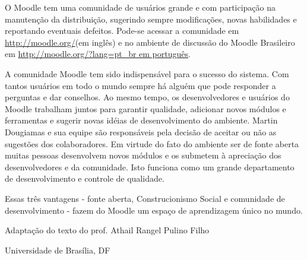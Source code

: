 O Moodle tem uma comunidade de usuários grande e com participação na manutenção da distribuição, sugerindo sempre modificações, novas habilidades e reportando eventuais defeitos. Pode-se acessar a comunidade em  \url{http://moodle.org/}(em inglês) e no ambiente de discussão do Moodle Brasileiro em \url{http://moodle.org/?lang=pt_br em português}.

A comunidade Moodle tem sido indispensável para o sucesso do sistema. Com tantos usuários em todo o mundo sempre há alguém que pode responder a perguntas e dar conselhos. Ao mesmo tempo, os desenvolvedores e usuários do Moodle trabalham juntos para garantir qualidade, adicionar novos módulos e ferramentas e sugerir novas idéias de desenvolvimento do ambiente. Martin Dougiamas e sua equipe são responsáveis pela decisão de aceitar ou não as sugestões dos colaboradores. Em virtude do fato do ambiente ser de fonte aberta muitas pessoas desenvolvem novos módulos e os submetem à apreciação dos desenvolvedores e da comunidade. Isto funciona como um grande departamento de desenvolvimento e controle de qualidade.

Essas três vantagens - fonte aberta, Construcionismo Social e comunidade de desenvolvimento - fazem do Moodle um espaço de aprendizagem único no mundo.

                                                     \begin{flushright}Adaptação do texto do prof. Athail Rangel Pulino Filho
                                                      
                                                                                 Universidade de Brasília, DF\end{flushright} 
                                                                                 

